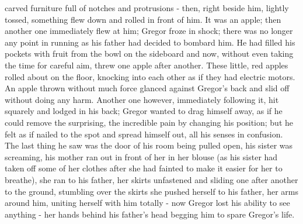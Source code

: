 carved furniture full of notches and protrusions - then, right beside him, lightly tossed, something flew down and rolled in front of him. It was an apple; then another one immediately flew at him; Gregor froze in shock; there was no longer any point in running as his father had decided to bombard him. He had filled his pockets with fruit from the bowl on the sideboard and now, without even taking the time for careful aim, threw one apple after another. These little, red apples rolled about on the floor, knocking into each other as if they had electric motors. An apple thrown without much force glanced against Gregor's back and slid off without doing any harm. Another one however, immediately following it, hit squarely and lodged in his back; Gregor wanted to drag himself away, as if he could remove the surprising, the incredible pain by changing his position; but he felt as if nailed to the spot and spread himself out, all his senses in confusion. The last thing he saw was the door of his room being pulled open, his sister was screaming, his mother ran out in front of her in her blouse (as his sister had taken off some of her clothes after she had fainted to make it easier for her to breathe), she ran to his father, her skirts unfastened and sliding one after another to the ground, stumbling over the skirts she pushed herself to his father, her arms around him, uniting herself with him totally - now Gregor lost his ability to see anything - her hands behind his father's head begging him to spare Gregor's life.